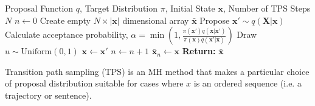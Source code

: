 \documentclass{article}
\newcommand{\realtraj}{\mathbf{x}}
\newcommand{\unrealtraj}{\mathbf{X}}
\begin{document}
\begin{algorithm}[h]
    \caption{Metropolis Hastings Algorithm}\label{alg:mh}
    \begin{algorithmic}
        \REQUIRE Proposal Function $q$, Target Distribution $\pi$, Initial State $\realtraj$, Number of TPS Steps $N$
        \STATE $n \gets 0$
        \STATE Create empty $N \times |\realtraj|$ dimensional array $\bar{\realtraj}$
        \STATE Propose $\realtraj' \sim q(\unrealtraj | \realtraj)$
        \STATE Calculate acceptance probability, $\alpha = \min \left( 1, \frac{\pi(\realtraj') q(\realtraj | \realtraj')}{\pi(\realtraj) q(\realtraj' | \realtraj)} \right)$
        \STATE Draw $u \sim \text{Uniform}(0, 1)$
        \STATE $\realtraj \gets \realtraj'$
        \ENDIF
        \STATE $n \gets n + 1$
        \STATE $\bar{\realtraj}_n \gets \realtraj$
        \ENDWHILE
        \STATE \textbf{Return: } $\bar{\realtraj}$
    \end{algorithmic}
\end{algorithm}

Transition path sampling (TPS) is an MH method that makes a particular choice of proposal distribution suitable for cases where $x$ is an ordered sequence (i.e. a trajectory or sentence).
\end{document}
